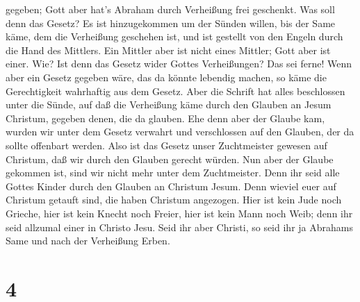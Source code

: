 gegeben; Gott aber hat's Abraham durch Verheißung frei geschenkt.
 Was soll denn das Gesetz? Es ist hinzugekommen um der
Sünden willen, bis der Same käme, dem die Verheißung geschehen ist, und
ist gestellt von den Engeln durch die Hand des Mittlers. 
Ein Mittler aber ist nicht eines Mittler; Gott aber ist einer.
 Wie? Ist denn das Gesetz wider Gottes Verheißungen? Das
sei ferne! Wenn aber ein Gesetz gegeben wäre, das da könnte lebendig
machen, so käme die Gerechtigkeit wahrhaftig aus dem Gesetz.
 Aber die Schrift hat alles beschlossen unter die Sünde,
auf daß die Verheißung käme durch den Glauben an Jesum Christum, gegeben
denen, die da glauben.  Ehe denn aber der Glaube kam,
wurden wir unter dem Gesetz verwahrt und verschlossen auf den Glauben,
der da sollte offenbart werden.  Also ist das Gesetz unser
Zuchtmeister gewesen auf Christum, daß wir durch den Glauben gerecht
würden.  Nun aber der Glaube gekommen ist, sind wir nicht
mehr unter dem Zuchtmeister.  Denn ihr seid alle Gottes
Kinder durch den Glauben an Christum Jesum.  Denn wieviel
euer auf Christum getauft sind, die haben Christum angezogen.
 Hier ist kein Jude noch Grieche, hier ist kein Knecht noch
Freier, hier ist kein Mann noch Weib; denn ihr seid allzumal einer in
Christo Jesu.  Seid ihr aber Christi, so seid ihr ja
Abrahams Same und nach der Verheißung Erben.

\hypertarget{section-3}{%
\section{4}\label{section-3}}

